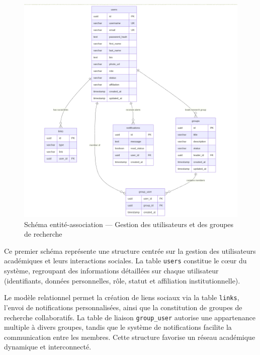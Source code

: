\documentclass[12pt]{rapportPfe}
\begin{document}
\begin{figure}[H]
    \centering
    \includegraphics[width=1.0\textwidth]{diagrams/diagram5.png}
    \caption{Schéma entité-association — Gestion des utilisateurs et des groupes de recherche}
    \label{fig:diagram5}
\end{figure}

Ce premier schéma représente une structure centrée sur la gestion des utilisateurs académiques et leurs interactions sociales. La table \texttt{users} constitue le cœur du système, regroupant des informations détaillées sur chaque utilisateur (identifiants, données personnelles, rôle, statut et affiliation institutionnelle). 

Le modèle relationnel permet la création de liens sociaux via la table \texttt{links}, l’envoi de notifications personnalisées, ainsi que la constitution de groupes de recherche collaboratifs. La table de liaison \texttt{group\_user} autorise une appartenance multiple à divers groupes, tandis que le système de notifications facilite la communication entre les membres. Cette structure favorise un réseau académique dynamique et interconnecté.
\end{document}
